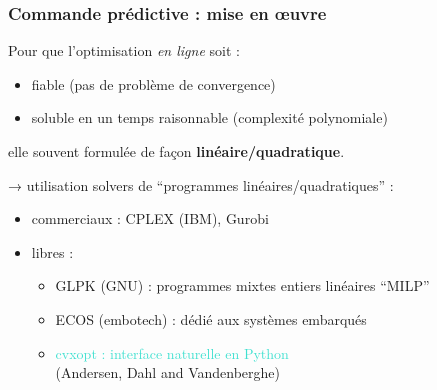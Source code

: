 \begin{frame}
  \frametitle{Commande prédictive : mise en œuvre}
  
  Pour que l'optimisation \emph{en ligne} soit :
  \begin{itemize}
   \item fiable (pas de problème de convergence)
   \item soluble en un temps raisonnable (complexité polynomiale)
  \end{itemize}
  elle souvent formulée de façon \textbf{linéaire/quadratique}.
  
  
  \bigskip \pause
  → utilisation solvers de ``programmes linéaires/quadratiques'' :
  
  \begin{itemize}
   \item commerciaux : CPLEX (IBM), Gurobi
   \item libres : 
   \begin{itemize}
    \item GLPK (GNU) : programmes mixtes entiers linéaires ``MILP''
    \item ECOS (embotech) : dédié aux systèmes embarqués
    \item \textcolor{turquoise}{cvxopt : interface naturelle en Python} \\ { \footnotesize (Andersen, Dahl and Vandenberghe)}
   \end{itemize}
  \end{itemize}
\end{frame}

